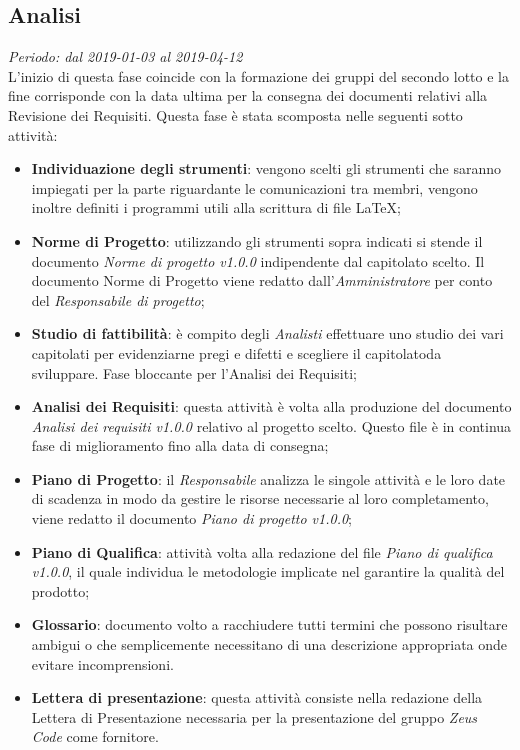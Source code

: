\subsection{Analisi}
\textit{Periodo: dal 2019-01-03 al 2019-04-12}\\
L'inizio di questa fase coincide con la formazione dei gruppi del secondo lotto e la fine corrisponde con la data ultima per la consegna dei documenti relativi alla Revisione dei Requisiti.
Questa fase è stata scomposta nelle seguenti sotto attività:
\begin{itemize}
	\item \textbf{Individuazione degli strumenti}: vengono scelti gli strumenti che saranno impiegati per la parte riguardante le comunicazioni tra membri, vengono inoltre definiti i programmi utili alla scrittura di file \LaTeX; 
	\item \textbf{Norme di Progetto}: utilizzando gli strumenti sopra indicati si stende il documento \textit{Norme di progetto v1.0.0} indipendente dal capitolato scelto. Il documento Norme di Progetto viene redatto dall'\textit{Amministratore} per conto del \textit{Responsabile di progetto};
	\item \textbf{Studio di fattibilità}: è compito degli \textit{Analisti} effettuare uno studio dei vari capitolati per evidenziarne pregi e difetti e scegliere il capitolato\glosp da sviluppare. Fase bloccante per l'Analisi dei Requisiti;
	\item \textbf{Analisi dei Requisiti}: questa attività è volta alla produzione del documento \textit{Analisi dei requisiti v1.0.0} relativo al progetto scelto. Questo file è in continua fase di miglioramento fino alla data di consegna;
	\item \textbf{Piano di Progetto}: il \textit{Responsabile} analizza le singole attività e le loro date di scadenza in modo da gestire le risorse necessarie al loro completamento, viene redatto il documento \textit{Piano di progetto v1.0.0};
	\item \textbf{Piano di Qualifica}: attività volta alla redazione del file \textit{Piano di qualifica v1.0.0}, il quale individua le metodologie implicate nel garantire la qualità del prodotto; 
	\item \textbf{Glossario}: documento volto a racchiudere tutti termini che possono risultare ambigui o che semplicemente necessitano di una descrizione appropriata onde evitare incomprensioni.
	\item \textbf{Lettera di presentazione}: questa attività consiste nella redazione della Lettera di Presentazione necessaria  per  la  presentazione del gruppo \textit{Zeus Code} come fornitore.
\end{itemize}
